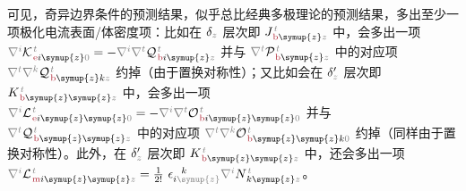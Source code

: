 可见，奇异边界条件的预测结果，似乎总比经典多极理论的预测结果，多出至少一项极化电流表面/体密度项：比如在 ${\delta}_{\mathcolor{gray}{z}}$ 层次即 ${J}^{\;\!\mathcolor{gray}{t}}_{\;\!\textcolor{Maroon}{\text{b}} \symup{z} \mathcolor{gray}{z}}$ 中，会多出一项 $\mathcolor{gray}{\nabla^i} {\mathcal{K}}^{\;\!\mathcolor{gray}{t}}_{\;\!\textcolor{Maroon}{\text{e}} i\symup{z}\mathcolor{gray}{0}} = - \mathcolor{gray}{\nabla^i} \mathcolor{gray}{\nabla^t} {\mathcal{Q}}^{\;\!\mathcolor{gray}{t}}_{\;\!\textcolor{Maroon}{\text{b}} i \symup{z} \mathcolor{gray}{z}}$ 并与 $\mathcolor{gray}{\nabla^t} {\mathcal{P}}^{\;\!\mathcolor{gray}{t}}_{\;\!\textcolor{Maroon}{\text{b}} \symup{z} \mathcolor{gray}{z}}$ 中的对应项 $\mathcolor{gray}{\nabla^t} \mathcolor{gray}{\nabla^k} {\mathcal{Q}}^{\;\!\mathcolor{gray}{t}}_{\;\!\textcolor{Maroon}{\text{b}} \symup{z}k \mathcolor{gray}{z}}$ 约掉（由于置换对称性）；又比如会在 ${\delta}'_{\mathcolor{gray}{z}}$ 层次即 ${K}^{\;\!\mathcolor{gray}{t}}_{\;\!\textcolor{Maroon}{\text{b}} \symup{z} \symup{z} \mathcolor{gray}{z}}$ 中，会多出一项 $\mathcolor{gray}{\nabla^i} {\mathcal{L}}^{\;\!\mathcolor{gray}{t}}_{\;\!\textcolor{Maroon}{\text{e}} i\symup{z} \symup{z} \mathcolor{gray}{0}} = - \mathcolor{gray}{\nabla^i} \mathcolor{gray}{\nabla^t} {\mathcal{O}}^{\;\!\mathcolor{gray}{t}}_{\;\!\textcolor{Maroon}{\text{b}} i\symup{z} \symup{z} \mathcolor{gray}{0}}$ 并与 $\mathcolor{gray}{\nabla^t} {\mathcal{Q}}^{\;\!\mathcolor{gray}{t}}_{\;\!\textcolor{Maroon}{\text{b}} \symup{z} \symup{z} \mathcolor{gray}{z}}$ 中的对应项 $\mathcolor{gray}{\nabla^t} \mathcolor{gray}{\nabla^k} {\mathcal{O}}^{\;\!\mathcolor{gray}{t}}_{\;\!\textcolor{Maroon}{\text{b}} \symup{z} \symup{z}k \mathcolor{gray}{0}}$ 约掉（同样由于置换对称性）。此外，在 ${\delta}'_{\mathcolor{gray}{z}}$ 层次即 ${K}^{\;\!\mathcolor{gray}{t}}_{\;\!\textcolor{Maroon}{\text{b}} \symup{z} \symup{z} \mathcolor{gray}{z}}$ 中，还会多出一项 $\mathcolor{gray}{\nabla^i} {\mathcal{L}}^{\;\!\mathcolor{gray}{t}}_{\;\!\textcolor{Maroon}{\text{m}} i\symup{z} \symup{z} \mathcolor{gray}{z}} = \frac{1}{2!}~ \epsilon^{\hphantom{ij}k}_{i \mathcolor{gray}{\symup{z}}} \mathcolor{gray}{\nabla^i} N^{\;\!\mathcolor{gray}{t}}_{\;\! k\symup{z}\mathcolor{gray}{z}}$。

